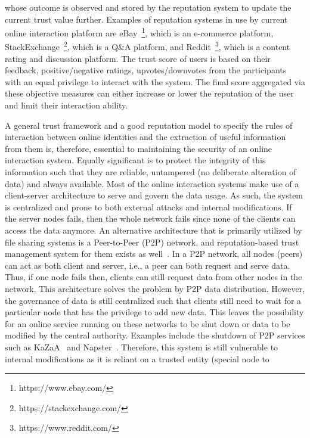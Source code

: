 whose outcome is observed and stored by the reputation system to update the
current trust value further. Examples of reputation systems in use by current
online interaction platform are eBay~\footnote{https://www.ebay.com/}, which is
an e-commerce platform, StackExchange~\footnote{https://stackexchange.com/},
which is a Q\&A platform, and Reddit~\footnote{https://www.reddit.com/}, which
is a content rating and discussion platform. The trust score of users is based
on their feedback, positive/negative ratings, upvotes/downvotes from the
participants with an equal privilege to interact with the system. The final
score aggregated via these objective measures can either increase or lower the
reputation of the user and limit their interaction ability. \par 

A general trust framework and a good reputation model to specify the rules of
interaction between online identities and the extraction of useful information
from them is, therefore, essential to maintaining the security of an online
interaction system. Equally significant is to protect the integrity of this
information such that they are reliable, untampered (no deliberate alteration
of data) and always available. Most of the online interaction systems make use
of a client-server architecture to serve and govern the data usage. As such,
the system is centralized and prone to both external attacks and internal
modifications. If the server nodes fails, then the whole network fails since
none of the clients can access the data anymore. An alternative architecture
that is primarily utilized by file sharing systems is a Peer-to-Peer (P2P)
network, and reputation-based trust management system for them exists as
well~\cite{selcuk2004reputation}. In a P2P network, all nodes (peers) can act
as both client and server, i.e., a peer can both request and serve data. Thus,
if one node fails then, clients can still request data from other nodes in the
network. This architecture solves the problem by P2P data distribution.
However, the governance of data is still centralized such that clients still
need to wait for a particular node that has the privilege to add new data. This
leaves the possibility for an online service running on these networks to be
shut down or data to be modified by the central authority. Examples include the
shutdown of P2P services such as KaZaA~\cite{mlcakova2004configuring} and
Napster~\cite{stern2000napster}. Therefore, this system is still vulnerable to
internal modifications as it is reliant on a trusted entity (special node to
